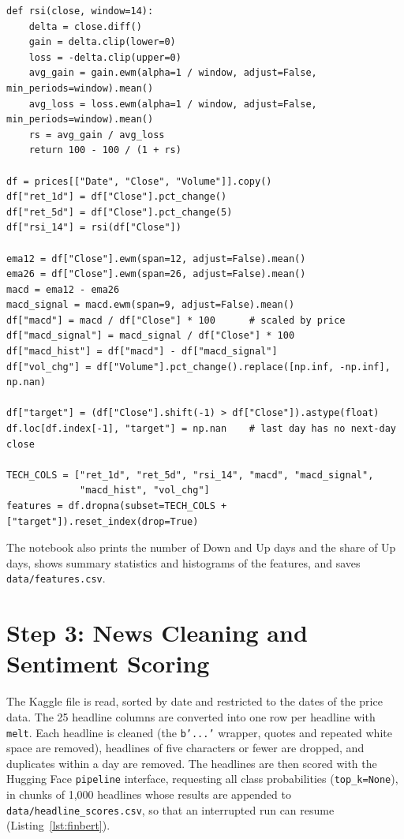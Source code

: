 \begin{lstlisting}[float=!htbp, caption={Technical features and target (Step 2).}, label={lst:features}]
def rsi(close, window=14):
    delta = close.diff()
    gain = delta.clip(lower=0)
    loss = -delta.clip(upper=0)
    avg_gain = gain.ewm(alpha=1 / window, adjust=False, min_periods=window).mean()
    avg_loss = loss.ewm(alpha=1 / window, adjust=False, min_periods=window).mean()
    rs = avg_gain / avg_loss
    return 100 - 100 / (1 + rs)

df = prices[["Date", "Close", "Volume"]].copy()
df["ret_1d"] = df["Close"].pct_change()
df["ret_5d"] = df["Close"].pct_change(5)
df["rsi_14"] = rsi(df["Close"])

ema12 = df["Close"].ewm(span=12, adjust=False).mean()
ema26 = df["Close"].ewm(span=26, adjust=False).mean()
macd = ema12 - ema26
macd_signal = macd.ewm(span=9, adjust=False).mean()
df["macd"] = macd / df["Close"] * 100      # scaled by price
df["macd_signal"] = macd_signal / df["Close"] * 100
df["macd_hist"] = df["macd"] - df["macd_signal"]
df["vol_chg"] = df["Volume"].pct_change().replace([np.inf, -np.inf], np.nan)

df["target"] = (df["Close"].shift(-1) > df["Close"]).astype(float)
df.loc[df.index[-1], "target"] = np.nan    # last day has no next-day close

TECH_COLS = ["ret_1d", "ret_5d", "rsi_14", "macd", "macd_signal",
             "macd_hist", "vol_chg"]
features = df.dropna(subset=TECH_COLS + ["target"]).reset_index(drop=True)
\end{lstlisting}

The notebook also prints the number of Down and Up days and the share of Up days, shows summary statistics and histograms of the features, and saves \texttt{data/features.csv}.

\section{Step 3: News Cleaning and Sentiment Scoring}
The Kaggle file is read, sorted by date and restricted to the dates of the price data. The 25 headline columns are converted into one row per headline with \texttt{melt}. Each headline is cleaned (the \texttt{b'...'} wrapper, quotes and repeated white space are removed), headlines of five characters or fewer are dropped, and duplicates within a day are removed. The headlines are then scored with the Hugging Face \texttt{pipeline} interface, requesting all class probabilities (\texttt{top\_k=None}), in chunks of 1,000 headlines whose results are appended to \texttt{data/headline\_scores.csv}, so that an interrupted run can resume (Listing~\ref{lst:finbert}).

